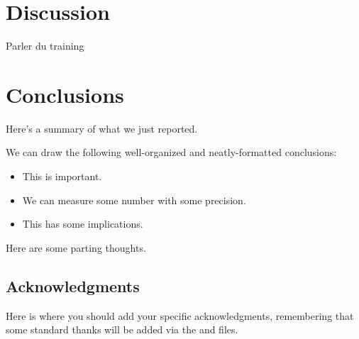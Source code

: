 \documentclass[\docopts]{\docclass}
\begin{document}

\section{Discussion}
\label{sec:discussion}

Parler du training



\section{Conclusions}
\label{sec:conclusions}

Here's a summary of what we just reported.

We can draw the following well-organized and neatly-formatted conclusions:
\begin{itemize}
  \item This is important.
  \item We can measure some number with some precision.
  \item This has some implications.
\end{itemize}

Here are some parting thoughts.



\subsection*{Acknowledgments}

Here is where you should add your specific acknowledgments, remembering that some standard thanks will be added via the  and  files.







\end{document}

